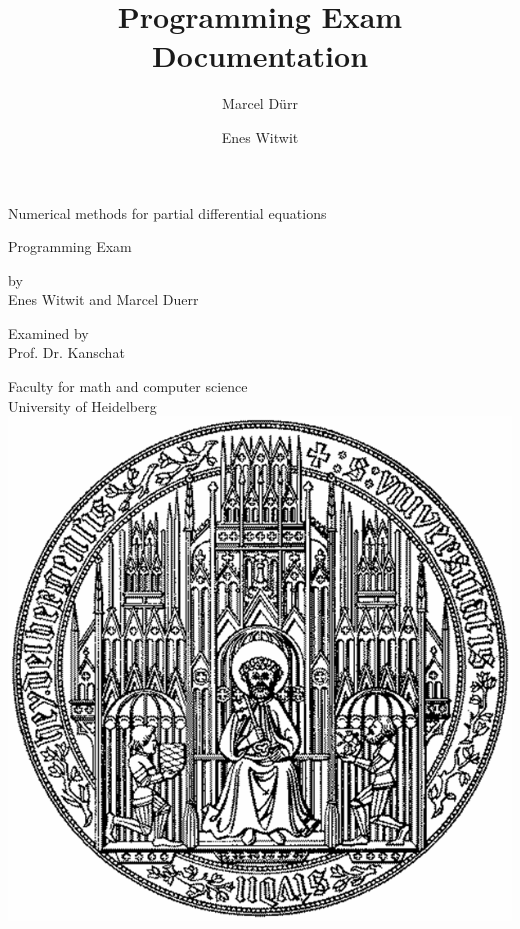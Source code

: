 \documentclass[a4paper,12pt]{report}
\begin{document}
\titleformat{\chapter}[block]{\bf\huge}{\thechapter}{2pc}{}

\title{Programming Exam Documentation}

\author{Marcel Dürr \and Enes Witwit}

\pagestyle{empty}




\begin{titlepage}

\begin{center} 
{\Huge Numerical methods for partial differential equations}
\vspace*{1cm}

{\Large Programming Exam}
\vspace*{1.5cm}

by \\[0.5cm]

{\Large Enes Witwit and Marcel Duerr}
\vspace*{1.5cm}

Examined by  \\[0.5cm]
{\Large Prof. Dr. Kanschat}
\vspace*{3cm}

Faculty for math and computer science\\[0.5cm]
University of Heidelberg \\[0.8cm]
\includegraphics[scale=0.2]{hd-logo.jpg} 
\end{center}
\end{titlepage}
\tableofcontents
\newpage
\end{document}
